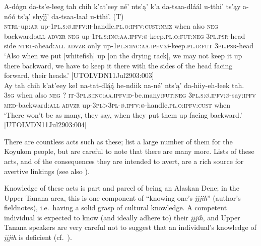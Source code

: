 \documentclass[output=paper,colorlinks,citecolor=brown
]{langscibook}
\begin{document}
\begin{exe}
\ex 
\label{fish-heads}
\begin{xlista}
\ex 
\gll A-dógn da-ts'e-łeeg tah chih k'at'eey né' nts'ą' k'a da-tsaa-dláál u-tthi' ts'ąy a-nóó ts'ą' shyį́į́' da-tsaa-łaał {u-tthi'. \textnormal{(T)}} \\
\textsc{ntrl}-up:\textsc{ar} up-\textsc{1pl.s:ø.ipfv:h}-handle.\textsc{pl.o:ipfv:cust:nmz} when also \textsc{neg} backward:\textsc{all} \textsc{advzr} \textsc{neg} up-\textsc{1pl.s:inc:aa.ipfv:ø}-keep.\textsc{pl.o:fut:neg} \textsc{3pl.psr}-head side \textsc{ntrl}-ahead:\textsc{all} \textsc{advzr} only up-\textsc{1pl.s:inc:aa.ipfv:ø}-keep.\textsc{pl.o:fut} \textsc{3pl.psr}-head \\
\glt `Also when we put [whitefish] up [on the drying rack], we may not keep it up there backward, we have to keep it there with the sides of the head facing forward, their heads.' \hfill [UTOLVDN11Jul2903:003]\\
\ex 
\gll Ay tah chih k'at'eey keł na-tat-dlą́ą́ he-ndiik na-né' nts'ą' da-hiiy-eh-łeek tah. \\
\textsc{3sg} when also \textsc{neg} ? \textsc{it-3pl.s:inc:aa.ipfv:d}-be.many:\textsc{fut:neg} \textsc{3pl.s:ø.ipfv:ø}-say:\textsc{ipfv} \textsc{med}-backward:\textsc{all} \textsc{advzr} up-\textsc{3pl>3pl-ø.ipfv:ø}-handle.\textsc{pl.o:ipfv:cust} when \\
\glt `There won't be as many, they say, when they put them up facing backward.' \hfill [UTOLVDN11Jul2903:004]\\
\end{xlista}
\end{exe}

 There are countless acts such as these; \citet[chs. 3, 4, 9, 14]{NelsonRMautnerKBaneG1982} list a large number of them for the Koyukon people, but are careful to note that there are many more. Lists of these acts, and of the consequences they are intended to avert, are a rich source for avertive linkings (see also ).

Knowledge of these acts is part and parcel of being an Alaskan Dene; in the Upper Tanana area, this is one component of ``knowing one's \textit{įįjih}'' (author's fieldnotes), i.e.\  having a solid grasp of cultural knowledge. A competent individual is expected to know (and ideally adhere to) their \textit{įįjih}, and Upper Tanana speakers are very careful not to suggest that an individual's knowledge of \textit{įįjih} is deficient (cf.\  \citealt[273]{LovickO2016}).
\end{document}
